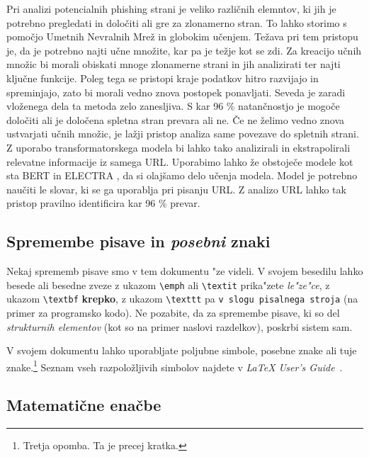 \documentclass[sigconf,nonacm]{acmart}
\begin{document}
Pri analizi potencialnih phishing strani je veliko različnih elemntov, ki jih je potrebno pregledati in določiti ali gre za zlonamerno stran. To lahko storimo s pomočjo Umetnih Nevralnih Mrež in globokim učenjem. Težava pri tem pristopu je, da je potrebno najti učne množite, kar pa je težje kot se zdi. Za kreacijo učnih množic bi morali obiskati mnoge zlonamerne strani in jih analizirati ter najti ključne funkcije. Poleg tega se pristopi kraje podatkov hitro razvijajo in spreminjajo, zato bi morali vedno znova postopek ponavljati. Seveda je zaradi vloženega dela ta metoda zelo zanesljiva. S kar 96 \% natančnostjo je mogoče določiti ali je določena spletna stran prevara ali ne.  Če ne želimo vedno znova ustvarjati učnih množic, je lažji pristop analiza same povezave do spletnih strani. Z uporabo transformatorskega modela bi lahko tako analizirali in ekstrapolirali relevatne informacije iz samega URL. Uporabimo lahko že obstoječe modele kot sta BERT \cite{devlin2018bert} in ELECTRA \cite{clark2020electra}, da si olajšamo delo učenja modela. Model je potrebno naučiti le slovar, ki se ga uporablja pri pisanju URL. Z analizo URL lahko tak pristop pravilno identificira kar 96 \% prevar. \cite{HAYNES2021127}



\subsection{Spremembe pisave in \emph{posebni} znaki}

Nekaj sprememb pisave smo v tem dokumentu "ze videli.  V svojem besedilu lahko
besede ali besedne zveze z ukazom \texttt{\textbackslash{}emph} ali
\texttt{\textbackslash{}textit} prika"zete \emph{le"ze"ce}, z ukazom
\texttt{\textbackslash{}textbf} \textbf{krepko}, z ukazom
\texttt{\textbackslash{}texttt} pa \texttt{v slogu pisalnega stroja} (na
primer za programsko kodo).  Ne pozabite, da za spremembe pisave, ki so del
\emph{strukturnih elementov} (kot so na primer naslovi razdelkov), poskrbi
sistem sam.

V svojem dokumentu lahko uporabljate poljubne simbole, posebne znake
ali tuje znake.\footnote{Tretja opomba. Ta je precej kratka.} Seznam vseh
razpoložljivih simbolov najdete v \emph{\LaTeX{} User's
Guide}~\cite{Lamport:LaTeX}.

\subsection{Matematične enačbe}
\end{document}
